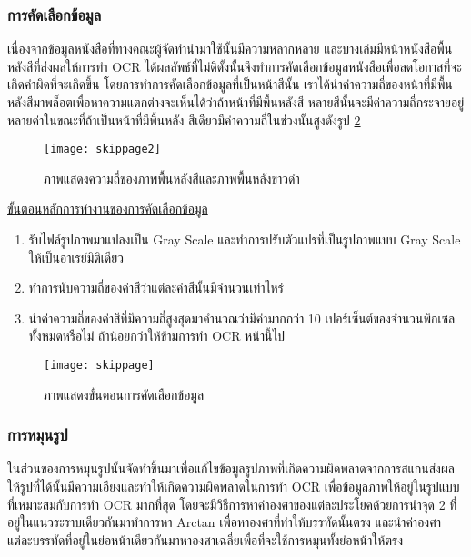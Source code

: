 \subsubsection{การคัดเลือกข้อมูล}
เนื่องจากข้อมูลหนังสือที่ทางคณะผู้จัดทำนำมาใช้นั้นมีความหลากหลาย และบางเล่มมีหน้าหนังสือพื้นหลังสีที่ส่งผลให้การทำ OCR ได้ผลลัพธ์ที่ไม่ดีดั้งนั้นจึงทำการคัดเลือกข้อมูลหนังสือเพื่อลดโอกาสที่จะเกิดคำผิดที่จะเกิดขึ้น 
โดยการทำการคัดเลือกข้อมูลที่เป็นหน้าสีนั้น เราได้นำค่าความถี่ของหน้าที่มีพื้นหลังสีมาพล็อตเพื่อหาความแตกต่างจะเห็นได้ว่าถ้าหน้าที่มีพื้นหลังสี หลายสีนั้นจะมีค่าความถี่กระจายอยู่หลายค่าในขณะที่ถ้าเป็นหน้าที่มีพื้นหลัง
สีเดียวมีค่าความถี่ในช่วงนั้นสูงดังรูป \ref{fig:skippage}

\begin{figure}[H]
    \centering
    \texttt{[image: skippage2]}
    \caption{ภาพแสดงความถี่ของภาพพื้นหลังสีและภาพพื้นหลังขาวดำ}\label{fig:skippage2}
\end{figure}

\underline{ขั้นตอนหลักการทำงานของการคัดเลือกข้อมูล}

\begin{enumerate}
    \item รับไฟล์รูปภาพมาแปลงเป็น Gray Scale และทำการปรับตัวแปรที่เป็นรูปภาพแบบ Gray Scale ให้เป็นอาเรย์มิติเดียว
    \item ทำการนับความถี่ของค่าสีว่าแต่ละค่าสีนั้นมีจำนวนเท่าไหร่
    \item นำค่าความถี่ของค่าสีที่มีความถี่สูงสุดมาคำนวณว่ามีค่ามากกว่า 10 เปอร์เซ็นต์ของจำนวนพิกเซลทั้งหมดหรือไม่ ถ้าน้อยกว่าให้ข้ามการทำ OCR หน้านี้ไป
\end{enumerate}

\begin{figure}[H]
    \centering
    \texttt{[image: skippage]}
    \caption{ภาพแสดงขั้นตอนการคัดเลือกข้อมูล}\label{fig:skippage}
\end{figure}

\subsubsection{การหมุนรูป}
ในส่วนของการหมุนรูปนั้นจัดทำขึ้นมาเพื่อแก้ไขข้อมูลรูปภาพที่เกิดความผิดพลาดจากการสแกนส่งผลให้รูปที่ได้นั้นมีความเอียงและทำให้เกิดความผิดพลาดในการทำ OCR เพื่อข้อมูลภาพให้อยู่ในรูปแบบที่เหมาะสมกับการทำ OCR มากที่สุด
โดยจะมีวิธีการหาค่าองศาของแต่ละประโยคด้วยการนำจุด 2 ที่อยู่ในแนวระราบเดียวกันมาทำการหา Arctan เพื่อหาองศาที่ทำให้บรรทัดนั้นตรง และนำค่าองศาแต่ละบรรทัดที่อยู่ในย่อหน้าเดียวกันมาหาองศาเฉลี่ยเพื่อที่จะใช้การหมุนทั้งย่อหน้าให้ตรง

